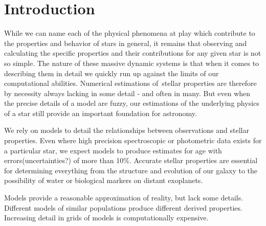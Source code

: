 \section{Introduction}

While we can name each of the physical phenomena at play which contribute to the properties and behavior of stars in general, it remains that observing and calculating the specific properties and their contributions for any given star is not so simple.
The nature of these massive dynamic systems is that when it comes to describing them in detail we quickly run up against the limits of our computational abilities.
Numerical estimations of stellar properties are therefore by necessity always lacking in some detail - and often in many.
But even when the precise details of a model are fuzzy, our estimations of the underlying physics of a star still provide an important foundation for astronomy.

We rely on models to detail the relationships between observations and stellar properties.
Even where high precision spectroscopic or photometric data exists for a particular star, we expect models to produce estimates for age with errors(uncertainties?) of more than 10\%.
Accurate stellar properties are essential for determining everything from the structure and evolution of our galaxy to the possibility of water or biological markers on distant exoplanets.

Models provide a reasonable approximation of reality, but lack some details.
Different models of similar populations produce different derived properties.
Increasing detail in grids of models is computationally expensive.

